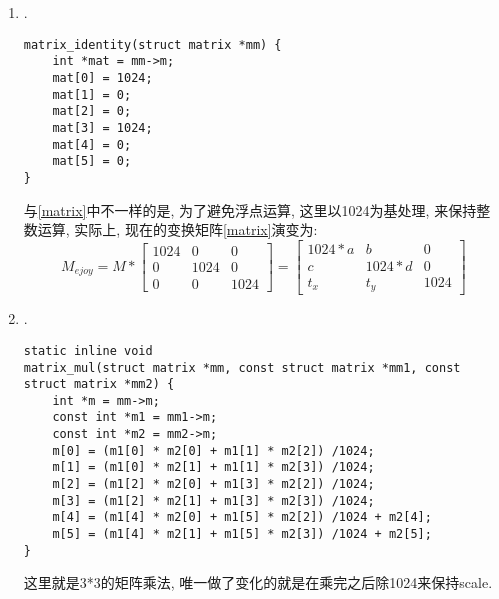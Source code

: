 {\begin {enumerate}
    \item { {}.
        \begin{lstlisting}[language={[ANSI]C}]
matrix_identity(struct matrix *mm) {
    int *mat = mm->m;
    mat[0] = 1024;
    mat[1] = 0;
    mat[2] = 0;
    mat[3] = 1024;
    mat[4] = 0;
    mat[5] = 0;
}
        \end{lstlisting}
        与\eqref{matrix}中不一样的是, 为了避免浮点运算, 这里以1024为基处理, 来保持整数运算, 实际上, 现在的变换矩阵\eqref{matrix}演变为:
        \begin{equation}\label{matrix_ejoy2d}
            M_{ejoy} =
            M *
            \begin{bmatrix}
                1024    &   0       &   0\\
                0       &   1024    &   0\\
                0       &   0       &   1024
            \end{bmatrix}
            =
            \begin{bmatrix}
                1024 * a    &   b           & 0 \\
                c           &   1024 * d    & 0 \\
                t_x         &   t_y         & 1024
            \end{bmatrix}
        \end{equation}
    }

    \gaccobsplitinv

    \item { {}.
        \begin{lstlisting}[language={[ANSI]C}]
static inline void
matrix_mul(struct matrix *mm, const struct matrix *mm1, const struct matrix *mm2) {
    int *m = mm->m;
    const int *m1 = mm1->m;
    const int *m2 = mm2->m;
    m[0] = (m1[0] * m2[0] + m1[1] * m2[2]) /1024;
    m[1] = (m1[0] * m2[1] + m1[1] * m2[3]) /1024;
    m[2] = (m1[2] * m2[0] + m1[3] * m2[2]) /1024;
    m[3] = (m1[2] * m2[1] + m1[3] * m2[3]) /1024;
    m[4] = (m1[4] * m2[0] + m1[5] * m2[2]) /1024 + m2[4];
    m[5] = (m1[4] * m2[1] + m1[5] * m2[3]) /1024 + m2[5];
}
        \end{lstlisting}
        这里就是3*3的矩阵乘法, 唯一做了变化的就是在乘完之后除1024来保持scale.
    }

    \gaccobsplitinv


\end{enumerate}}
